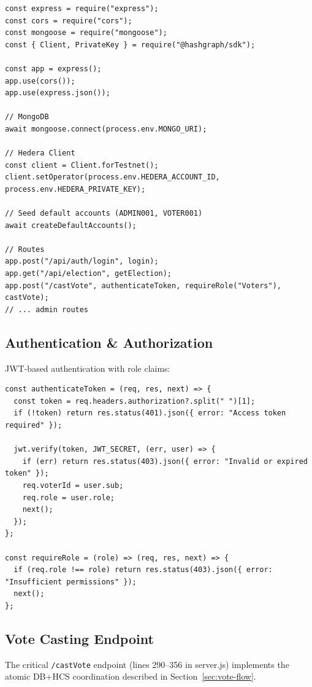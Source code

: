 \begin{lstlisting}[style=codeStyle, caption=Server initialization (excerpt), label=lst:server-init]
const express = require("express");
const cors = require("cors");
const mongoose = require("mongoose");
const { Client, PrivateKey } = require("@hashgraph/sdk");

const app = express();
app.use(cors());
app.use(express.json());

// MongoDB
await mongoose.connect(process.env.MONGO_URI);

// Hedera Client
const client = Client.forTestnet();
client.setOperator(process.env.HEDERA_ACCOUNT_ID, process.env.HEDERA_PRIVATE_KEY);

// Seed default accounts (ADMIN001, VOTER001)
await createDefaultAccounts();

// Routes
app.post("/api/auth/login", login);
app.get("/api/election", getElection);
app.post("/castVote", authenticateToken, requireRole("Voters"), castVote);
// ... admin routes
\end{lstlisting}

\subsection{Authentication \& Authorization}
\label{sec:auth-impl}

JWT-based authentication with role claims:

\begin{lstlisting}[style=codeStyle, caption=JWT middleware, label=lst:jwt-middleware]
const authenticateToken = (req, res, next) => {
  const token = req.headers.authorization?.split(" ")[1];
  if (!token) return res.status(401).json({ error: "Access token required" });

  jwt.verify(token, JWT_SECRET, (err, user) => {
    if (err) return res.status(403).json({ error: "Invalid or expired token" });
    req.voterId = user.sub;
    req.role = user.role;
    next();
  });
};

const requireRole = (role) => (req, res, next) => {
  if (req.role !== role) return res.status(403).json({ error: "Insufficient permissions" });
  next();
};
\end{lstlisting}

\subsection{Vote Casting Endpoint}
\label{sec:vote-endpoint}

The critical \texttt{/castVote} endpoint (lines 290--356 in server.js) implements
the atomic DB+HCS coordination described in Section~\ref{sec:vote-flow}.

